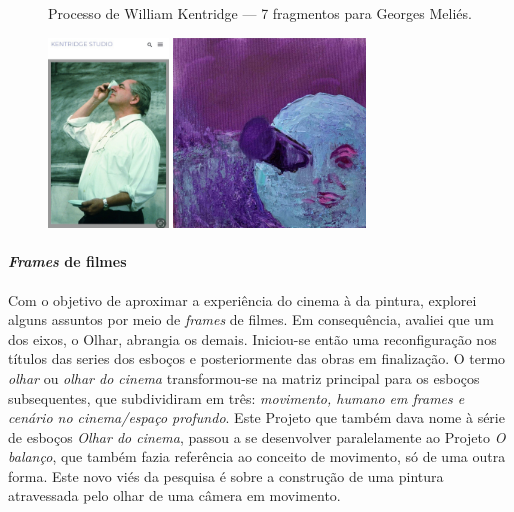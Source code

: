 \begin{figure}
\begin{minipage}{.4\linewidth}
	\caption{Processo de William Kentridge --- 7 fragmentos para Georges
		Meliés.}

	\includegraphics[height=1.98507in]{figuras/kentridge-7-fragmentos-georges-melies.pdf.compressed.pdf}
\end{minipage}\hfill
\begin{minipage}{.4\linewidth}
  \caption{ \phantom{aaaaaaaaaaaa}}

	\includegraphics[height=1.98507in]{figuras/boudet-cena-melies.pdf.compressed.pdf}
\end{minipage}
\end{figure}


\paragraph{\emph{Frames} de filmes} Com o objetivo de aproximar a experiência do cinema à da
pintura, explorei alguns assuntos por meio de \emph{frames} de filmes.
Em consequência, avaliei que um dos eixos, o Olhar, abrangia os demais.
Iniciou-se então uma reconfiguração nos títulos das series dos esboços
e posteriormente das obras em finalização. O termo \emph{olhar} ou
\emph{olhar do cinema} transformou-se na matriz principal para os
esboços subsequentes, que subdividiram em três: \emph{movimento, humano
	em frames e cenário no cinema/espaço profundo}. Este Projeto que também
dava nome à série de esboços \emph{Olhar do cinema}, passou a se
desenvolver paralelamente ao Projeto \emph{O balanço}, que também fazia
referência ao conceito de movimento, só de uma outra forma. Este novo
viés da pesquisa é sobre a construção de uma pintura atravessada pelo
olhar de uma câmera em movimento.

